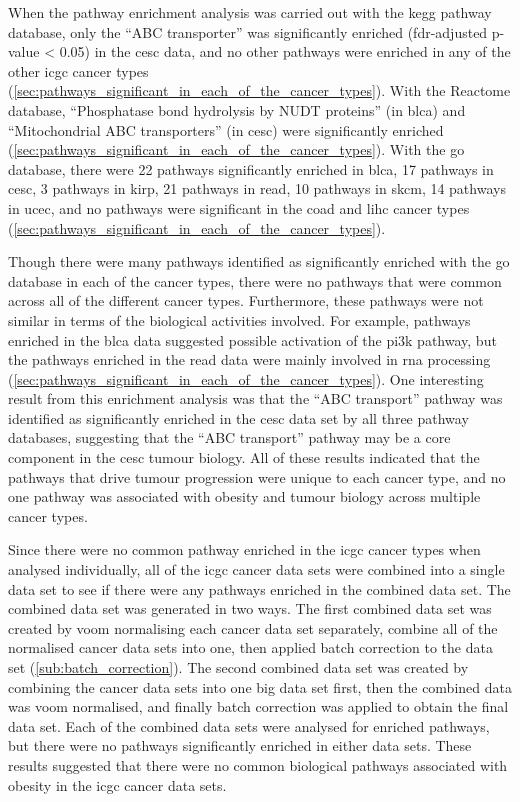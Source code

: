 When the pathway enrichment analysis was carried out with the \gls{kegg} pathway database, only the ``ABC transporter'' was significantly enriched (\gls{fdr}-adjusted p-value \textless{} 0.05) in the \gls{cesc} data, and no other pathways were enriched in any of the other \gls{icgc} cancer types (\cref{sec:pathways_significant_in_each_of_the_cancer_types}).
With the Reactome database, ``Phosphatase bond hydrolysis by NUDT proteins'' (in \gls{blca}) and ``Mitochondrial ABC transporters'' (in \gls{cesc}) were significantly enriched (\cref{sec:pathways_significant_in_each_of_the_cancer_types}).
With the \gls{go} database, there were 22 pathways significantly enriched in \gls{blca}, 17 pathways in \gls{cesc}, 3 pathways in \gls{kirp}, 21 pathways in \gls{read}, 10 pathways in \gls{skcm}, 14 pathways in \gls{ucec}, and no pathways were significant in the \gls{coad} and \gls{lihc} cancer types (\cref{sec:pathways_significant_in_each_of_the_cancer_types}).

Though there were many pathways identified as significantly enriched with the \gls{go} database in each of the cancer types, there were no pathways that were common across all of the different cancer types.
Furthermore, these pathways were not similar in terms of the biological activities involved.
For example, pathways enriched in the \gls{blca} data suggested possible activation of the \gls{pi3k} pathway, but the pathways enriched in the \gls{read} data were mainly involved in \acrshort{rna} processing (\cref{sec:pathways_significant_in_each_of_the_cancer_types}).
One interesting result from this enrichment analysis was that the ``ABC transport'' pathway was identified as significantly enriched in the \gls{cesc} data set by all three pathway databases, suggesting that the ``ABC transport'' pathway may be a core component in the \gls{cesc} tumour biology.
All of these results indicated that the pathways that drive tumour progression were unique to each cancer type, and no one pathway was associated with obesity and tumour biology across multiple cancer types.

Since there were no common pathway enriched in the \gls{icgc} cancer types when analysed individually, all of the \gls{icgc} cancer data sets were combined into a single data set to see if there were any pathways enriched in the combined data set.
The combined data set was generated in two ways.
The first combined data set was created by voom normalising each cancer data set separately, combine all of the normalised cancer data sets into one, then applied batch correction to the data set (\cref{sub:batch_correction}).
The second combined data set was created by combining the cancer data sets into one big data set first, then the combined data was voom normalised, and finally batch correction was applied to obtain the final data set.
Each of the combined data sets were analysed for enriched pathways, but there were no pathways significantly enriched in either data sets.
These results suggested that there were no common biological pathways associated with obesity in the \gls{icgc} cancer data sets.

